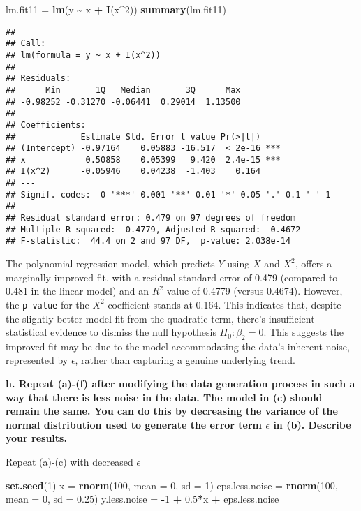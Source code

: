 \documentclass[
]{article}
\newenvironment{Shaded}{\begin{snugshade}}{\end{snugshade}}
\newcommand{\AttributeTok}[1]{\textcolor[rgb]{0.13,0.29,0.53}{#1}}
\newcommand{\DecValTok}[1]{\textcolor[rgb]{0.00,0.00,0.81}{#1}}
\newcommand{\FloatTok}[1]{\textcolor[rgb]{0.00,0.00,0.81}{#1}}
\newcommand{\FunctionTok}[1]{\textcolor[rgb]{0.13,0.29,0.53}{\textbf{#1}}}
\newcommand{\NormalTok}[1]{#1}
\newcommand{\OtherTok}[1]{\textcolor[rgb]{0.56,0.35,0.01}{#1}}
\newcommand{\SpecialCharTok}[1]{\textcolor[rgb]{0.81,0.36,0.00}{\textbf{#1}}}
\begin{document}
\begin{Shaded}
\begin{Highlighting}[]
\NormalTok{lm.fit11 }\OtherTok{=} \FunctionTok{lm}\NormalTok{(y }\SpecialCharTok{\textasciitilde{}}\NormalTok{ x }\SpecialCharTok{+} \FunctionTok{I}\NormalTok{(x}\SpecialCharTok{\^{}}\DecValTok{2}\NormalTok{))}
\FunctionTok{summary}\NormalTok{(lm.fit11)}
\end{Highlighting}
\end{Shaded}

\begin{verbatim}
## 
## Call:
## lm(formula = y ~ x + I(x^2))
## 
## Residuals:
##      Min       1Q   Median       3Q      Max 
## -0.98252 -0.31270 -0.06441  0.29014  1.13500 
## 
## Coefficients:
##             Estimate Std. Error t value Pr(>|t|)    
## (Intercept) -0.97164    0.05883 -16.517  < 2e-16 ***
## x            0.50858    0.05399   9.420  2.4e-15 ***
## I(x^2)      -0.05946    0.04238  -1.403    0.164    
## ---
## Signif. codes:  0 '***' 0.001 '**' 0.01 '*' 0.05 '.' 0.1 ' ' 1
## 
## Residual standard error: 0.479 on 97 degrees of freedom
## Multiple R-squared:  0.4779, Adjusted R-squared:  0.4672 
## F-statistic:  44.4 on 2 and 97 DF,  p-value: 2.038e-14
\end{verbatim}

The polynomial regression model, which predicts \(Y\) using \(X\) and
\(X^2\), offers a marginally improved fit, with a residual standard
error of 0.479 (compared to 0.481 in the linear model) and an \(R^2\)
value of 0.4779 (versus 0.4674). However, the \texttt{p-value} for the
\(X^2\) coefficient stands at 0.164. This indicates that, despite the
slightly better model fit from the quadratic term, there's insufficient
statistical evidence to dismiss the null hypothesis
\(H_0: \beta_2 = 0\). This suggests the improved fit may be due to the
model accommodating the data's inherent noise, represented by
\(\epsilon\), rather than capturing a genuine underlying trend.

\textbf{h. Repeat (a)-(f) after modifying the data generation process in
such a way that there is less noise in the data. The model in (c) should
remain the same. You can do this by decreasing the variance of the
normal distribution used to generate the error term \(\epsilon\) in (b).
Describe your results.}

Repeat (a)-(c) with decreased \(\epsilon\)

\begin{Shaded}
\begin{Highlighting}[]
\FunctionTok{set.seed}\NormalTok{(}\DecValTok{1}\NormalTok{)}
\NormalTok{x }\OtherTok{=} \FunctionTok{rnorm}\NormalTok{(}\DecValTok{100}\NormalTok{, }\AttributeTok{mean =} \DecValTok{0}\NormalTok{, }\AttributeTok{sd =} \DecValTok{1}\NormalTok{)}
\NormalTok{eps.less.noise }\OtherTok{=} \FunctionTok{rnorm}\NormalTok{(}\DecValTok{100}\NormalTok{, }\AttributeTok{mean =} \DecValTok{0}\NormalTok{, }\AttributeTok{sd =} \FloatTok{0.25}\NormalTok{)}
\NormalTok{y.less.noise }\OtherTok{=} \SpecialCharTok{{-}}\DecValTok{1} \SpecialCharTok{+} \FloatTok{0.5}\SpecialCharTok{*}\NormalTok{x }\SpecialCharTok{+}\NormalTok{ eps.less.noise}
\end{Highlighting}
\end{Shaded}
\end{document}
